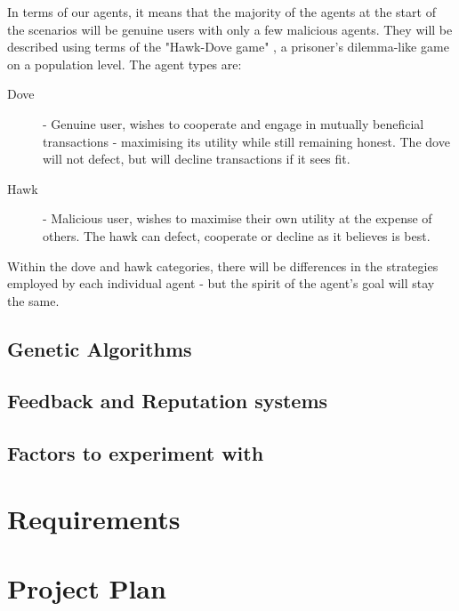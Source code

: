 \documentclass{article}
\begin{document}
In terms of our agents, it means that the majority of the agents at the start of the scenarios will be genuine users with only a few malicious agents. They will be described using terms of the "Hawk-Dove game" \cite{smith1973lhe}, a prisoner's dilemma-like game on a population level. The agent types are:
\begin{description}
	\item[Dove] - Genuine user, wishes to cooperate and engage in mutually beneficial transactions - maximising its utility while still remaining honest. The dove will not defect, but will decline transactions if it sees fit.
	\item[Hawk] - Malicious user, wishes to maximise their own utility at the expense of others. The hawk can defect, cooperate or decline as it believes is best.
\end{description}

Within the dove and hawk categories, there will be differences in the strategies employed by each individual agent - but the spirit of the agent's goal will stay the same.

\subsection{Genetic Algorithms}
\label{sec:genetic-algorithms}

\subsection{Feedback and Reputation systems}
\label{sec:reputation-systems}

\subsection{Factors to experiment with}
\label{sec:factors-experiment}

\section{Requirements}
\label{sec:requirements}

\section{Project Plan}
\label{sec:project-plan}

\printbibliography
\end{document}
